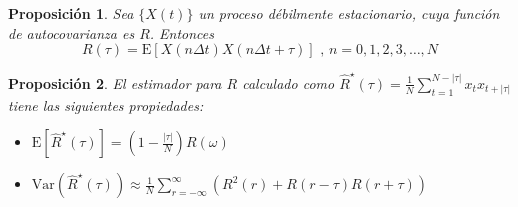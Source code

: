 \documentclass{beamer}
\newtheorem{prop}{Proposici\'on}
\newcommand{\aste}[1]{\widehat{ #1 }^{\star}}
\newcommand{\E}[1]{\mathrm{E}\left[ #1 \right]}
\newcommand{\Var}[1]{\mathrm{Var}\left( #1 \right)}
\newcommand{\Cov}[1]{\mathrm{Cov}\left( #1 \right)}
\newcommand{\abso}[1]{\left| #1 \right|}
\begin{document}

\begin{frame}%
\begin{prop}
Sea $\{ X(t) \}$ un proceso d\'ebilmente estacionario, cuya funci\'on de autocovarianza es $R$.
Entonces
\begin{equation*}
R(\tau) = \E{X(n\Delta t)X(n\Delta t + \tau)} \text{  ,  } n = 0, 1, 2,  3,\dots, N
\end{equation*}
\end{prop}

\begin{prop}
El estimador para $R$ calculado como
$ \displaystyle
\aste{R}(\tau) = \frac{1}{N} 
\sum_{t = 1}^{N-\abso{\tau}} x_t x_{t+\abso{\tau}}
$
tiene las siguientes propiedades:
\begin{itemize}
\item $\E{\aste{R}(\tau)} = \left(1 - \frac{\abso{\tau}}{N} \right) R(\omega)$
\item $\Var{\aste{R}(\tau)} \approx \frac{1}{N} 
\sum_{r=-\infty}^{\infty} \left( R^{2}(r) + R(r-\tau)R(r+\tau) \right)$
\end{itemize}
\end{prop}
\end{frame}

\end{document}
